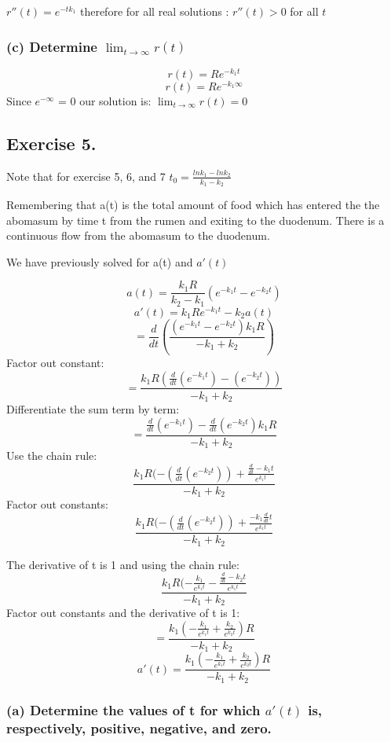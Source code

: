 \documentclass[]{article}
\begin{document}
\(r''(t) = e^{-t k_1}\) therefore for all real solutions :
\(r''(t) > 0\) for all \(t\)

\subsubsection{\texorpdfstring{(c) Determine
\(\lim_{t\to\infty}r(t)\)}{(c) Determine \textbackslash{}lim\_\{t\textbackslash{}to\textbackslash{}infty\}r(t)}}\label{c-determine-lim_ttoinftyrt}

\[r(t) = Re^{-k_1t}\] \[r(t) = Re^{-k_1 \infty}\] Since \(e^{-\infty}\)
= 0 our solution is: \(\lim_{t\to\infty}r(t) =0\)

\subsection{Exercise 5.}\label{exercise-5.}

Note that for exercise 5, 6, and 7
\(t_0 = \frac{ln k_1 - ln k_2}{k_1 - k_2}\)

Remembering that a(t) is the total amount of food which has entered the
the abomasum by time t from the rumen and exiting to the duodenum. There
is a continuous flow from the abomasum to the duodenum.

We have previously solved for a(t) and \(a'(t)\)

\[a(t) = \frac{k_1 R}{k_2-k_1}(e^{-k_1t} - e^{-k_2t})\]
\[a'(t) = k_1Re^{-k_1t}-k_2a(t)\]
\[= \frac{d}{dt}(\frac{(e^{-k_1 t}- e^{-k_2 t})k_1 R}{-k_1 + k_2})\]
Factor out constant:
\[=\frac{k_1 R (\frac{d}{dt}(e^{-k_1 t})-(e^{-k_2 t}))}{-k_1 + k_2}\]
Differentiate the sum term by term:
\[=\frac{\frac{d}{dt}(e^{-k_1 t})- \frac{d}{dt}(e^{-k_2 t})k_1 R}{-k_1 + k_2}\]
Use the chain rule:
\[\frac{k_1 R (-(\frac{d}{dt}(e^{-k_2t}))+\frac{\frac{d}{dt}-k_1t}{e^{k_1t}}}{-k_1 +k_2}\]
Factor out constants:
\[\frac{k_1 R (-(\frac{d}{dt}(e^{-k_2t}))+\frac{-k_1\frac{d}{dt}t}{e^{k_1t}}}{-k_1 +k_2}\]

The derivative of t is 1 and using the chain rule:
\[\frac{k_1 R(-\frac{k_1}{e^{k_1 t}}-\frac{\frac{d}{dt}-k_2t}{e^{k_1t}}}{-k_1 +k_2}\]
Factor out constants and the derivative of t is 1:
\[= \frac{k_1 ( -\frac{k_1}{e^{k_1t}}+\frac{k_2}{e^{k_2t}})R}{-k_1 + k_2}\]
\[a'(t) = \frac{k_1 ( -\frac{k_1}{e^{k_1t}}+\frac{k_2}{e^{k_2t}})R}{-k_1 + k_2}\]

\subsubsection{\texorpdfstring{(a) Determine the values of t for which
\(a'(t)\) is, respectively, positive, negative, and
zero.}{(a) Determine the values of t for which a'(t) is, respectively, positive, negative, and zero.}}\label{a-determine-the-values-of-t-for-which-at-is-respectively-positive-negative-and-zero.}
\end{document}
